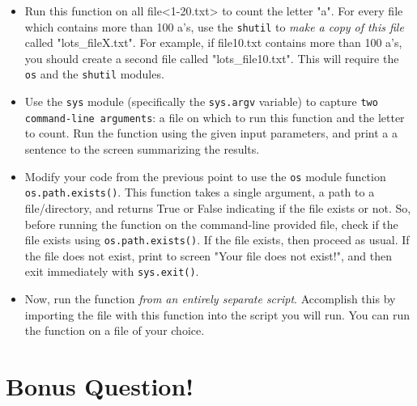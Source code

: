 \documentclass{article}[12pt]
\newcommand{\code}[1]{\texttt{#1}}  %
\begin{document}
\begin{enumerate}
	\begin{itemize}
		\item Run this function on all file<1-20.txt> to count the letter "a". For every file which contains more than 100 a's, use the \code{shutil} to \emph{make a copy of this file} called "lots\_fileX.txt". For example, if file10.txt contains more than 100 a's, you should create a second file called "lots\_file10.txt". This will require the \code{os} and the \code{shutil} modules.
		\item Use the \code{sys} module (specifically the \code{sys.argv} variable) to capture \code{two command-line arguments}: a file on which to run this function and the letter to count. Run the function using the given input parameters, and print a a sentence to the screen summarizing the results.
		\item Modify your code from the previous point to use the \code{os} module function \code{os.path.exists()}. This function takes a single argument, a path to a file/directory, and returns True or False indicating if the file exists or not. So, before running the function on the command-line provided file, check if the file exists using \code{os.path.exists()}. If the file exists, then proceed as usual. If the file does not exist, print to screen "Your file does not exist!", and then exit immediately with \code{sys.exit()}.
		\item Now, run the function \emph{from an entirely separate script}. Accomplish this by importing the file with this function into the script you will run. You can run the function on a file of your choice.
	\end{itemize}


\end{enumerate}


\section*{Bonus Question!}	
	
\end{document}
